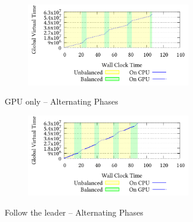 \documentclass[]{article}
\begin{document}
\setcounter{figure}{1}
\renewcommand{\thefigure}{\arabic{figure}f}
\begin{figure}[!h]
\centering
\begin{subfigure}[b]{\mysize}
\centering
\includegraphics[width=0.8\textwidth]{figures_original/alternating/2.processed.pdf}
\renewcommand{\thesubfigure}{Original}
\caption{}
\end{subfigure}
\begin{subfigure}[b]{\mysize}
\centering
{}
\renewcommand{\thesubfigure}{Reproduced}
\caption{}
\end{subfigure}
\caption{GPU only – Alternating Phases}
\end{figure}



\setcounter{figure}{1}
\renewcommand{\thefigure}{\arabic{figure}i}
\begin{figure}[!h]
\centering
\begin{subfigure}[b]{\mysize}
\centering
\includegraphics[width=0.8\textwidth]{figures_original/alternating/3.processed.pdf}
\renewcommand{\thesubfigure}{Original}
\caption{}
\end{subfigure}
\begin{subfigure}[b]{\mysize}
\centering
{}
\renewcommand{\thesubfigure}{Reproduced}
\caption{}
\end{subfigure}
\caption{Follow the leader – Alternating Phases}
\end{figure}
\end{document}
